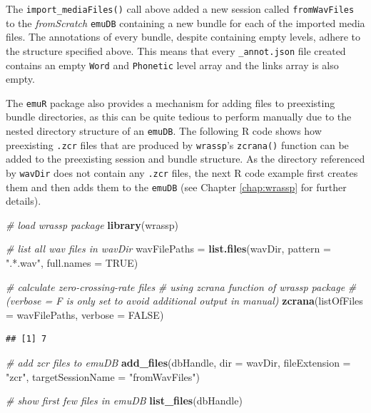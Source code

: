 \documentclass[]{book}
\newenvironment{Shaded}{\begin{snugshade}}{\end{snugshade}}
\newcommand{\CommentTok}[1]{\textcolor[rgb]{0.56,0.35,0.01}{\textit{#1}}}
\newcommand{\DataTypeTok}[1]{\textcolor[rgb]{0.13,0.29,0.53}{#1}}
\newcommand{\KeywordTok}[1]{\textcolor[rgb]{0.13,0.29,0.53}{\textbf{#1}}}
\newcommand{\NormalTok}[1]{#1}
\newcommand{\OtherTok}[1]{\textcolor[rgb]{0.56,0.35,0.01}{#1}}
\newcommand{\StringTok}[1]{\textcolor[rgb]{0.31,0.60,0.02}{#1}}
\begin{document}
The \texttt{import\_mediaFiles()} call above added a new session called \texttt{fromWavFiles} to the \emph{fromScratch} \texttt{emuDB} containing a new bundle for each of the imported media files. The annotations of every bundle, despite containing empty levels, adhere to the structure specified above. This means that every \texttt{\_annot.json} file created contains an empty \texttt{Word} and \texttt{Phonetic} level array and the links array is also empty.

The \texttt{emuR} package also provides a mechanism for adding files to preexisting bundle directories, as this can be quite tedious to perform manually due to the nested directory structure of an \texttt{emuDB}. The following R code shows how preexisting \texttt{.zcr} files that are produced by \texttt{wrassp}'s \texttt{zcrana()} function can be added to the preexisting session and bundle structure. As the directory referenced by \texttt{wavDir} does not contain any \texttt{.zcr} files, the next R code example first creates them and then adds them to the \texttt{emuDB} (see Chapter \ref{chap:wrassp} for further details).

\begin{Shaded}
\begin{Highlighting}[]
\CommentTok{# load wrassp package}
\KeywordTok{library}\NormalTok{(wrassp)}

\CommentTok{# list all wav files in wavDir}
\NormalTok{wavFilePaths =}\StringTok{ }\KeywordTok{list.files}\NormalTok{(wavDir,}
                          \DataTypeTok{pattern =} \StringTok{".*.wav"}\NormalTok{,}
                          \DataTypeTok{full.names =} \OtherTok{TRUE}\NormalTok{)}

\CommentTok{# calculate zero-crossing-rate files}
\CommentTok{# using zcrana function of wrassp package}
\CommentTok{# (verbose = F is only set to avoid additional output in manual)}
\KeywordTok{zcrana}\NormalTok{(}\DataTypeTok{listOfFiles =}\NormalTok{ wavFilePaths,}
       \DataTypeTok{verbose =} \OtherTok{FALSE}\NormalTok{)}
\end{Highlighting}
\end{Shaded}

\begin{verbatim}
## [1] 7
\end{verbatim}

\begin{Shaded}
\begin{Highlighting}[]
\CommentTok{# add zcr files to emuDB}
\KeywordTok{add_files}\NormalTok{(dbHandle,}
          \DataTypeTok{dir =}\NormalTok{ wavDir,}
          \DataTypeTok{fileExtension =} \StringTok{"zcr"}\NormalTok{,}
          \DataTypeTok{targetSessionName =} \StringTok{"fromWavFiles"}\NormalTok{)}

\CommentTok{# show first few files in emuDB}
\KeywordTok{list_files}\NormalTok{(dbHandle)}
\end{Highlighting}
\end{Shaded}
\end{document}
